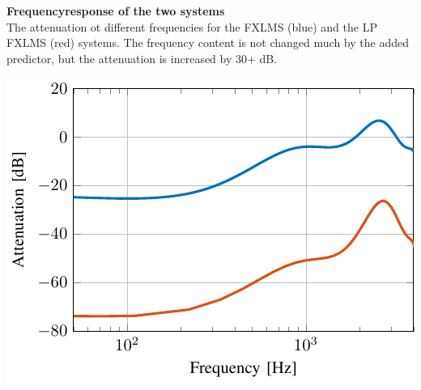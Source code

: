 \begin{minipage}{.5\columnwidth}
	\textbf{Frequencyresponse of the two systems}\\
The attenuation ot different frequencies for the FXLMS (blue) and the LP FXLMS (red) systems. The frequency content is not changed much by the added predictor, but the attenuation is increased by 30+ dB. 
\end{minipage}%
\begin{minipage}{0.5\columnwidth}
	\includegraphics[width=\textwidth]{figures/ComparedConusmerHPOur.pdf}
\end{minipage}

